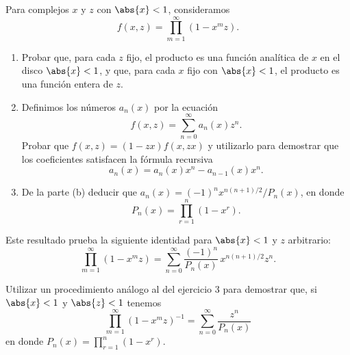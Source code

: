 \documentclass[12pt,a4paper]{book}
\begin{document}
    \begin{ejercicio}
        Para complejos $x$ y $z$ con $\abs{x}<1$, consideramos
        \begin{equation*}
            f(x,z)=\prod_{m=1}^{\infty}(1-x^{m}z).
        \end{equation*}
        \begin{enumerate}
            \item[(a)] Probar que, para cada $z$ fijo, el producto es una función analítica de
            $x$ en el disco $\abs{x}<1$, y que, para cada $x$ fijo con $\abs{x}<1$, el
            producto es una función entera de $z$.
            \item[(b)] Definimos los números $a_{n}(x)$ por la ecuación
            \begin{equation*}
                f(x,z)=\sum_{n=0}^{\infty}a_{n}(x)z^{n}.
            \end{equation*}
            Probar que $f(x,z)=(1-zx)f(x,zx)$ y utilizarlo para demostrar que los coeficientes
            satisfacen la fórmula recursiva
            \begin{equation*}
                a_{n}(x)=a_{n}(x)x^{n}-a_{n-1}(x)x^{n}.
            \end{equation*}
            \item[(c)] De la parte (b) deducir que $a_{n}(x)=(-1)^{n}x^{n(n+1)/2}/P_{n}(x)$, en donde
            \begin{equation*}
                P_{n}(x)=\prod_{r=1}^{n}(1-x^{r}).
            \end{equation*}
        \end{enumerate}
        Este resultado prueba la siguiente identidad para $\abs{x}<1$ y $z$ arbitrario:
        \begin{equation*}
            \prod_{m=1}^{\infty}(1-x^{m}z)=\sum_{n=0}^{\infty}\frac{(-1)^{n}}{P_{n}(x)}\,x^{n(n+1)/2}z^{n}.
        \end{equation*}
    \end{ejercicio}

    \begin{ejercicio}
        Utilizar un procedimiento análogo al del ejercicio 3 para demostrar que, si $\abs{x}<1$
        y $\abs{z}<1$ tenemos
        \begin{equation*}
            \prod_{m=1}^{\infty}(1-x^{m}z)^{-1}=\sum_{n=0}^{\infty}\frac{z^{n}}{P_{n}(x)}
        \end{equation*}
        en donde $P_{n}(x)=\prod_{r=1}^{n}(1-x^{r})$.
    \end{ejercicio}
\end{document}
